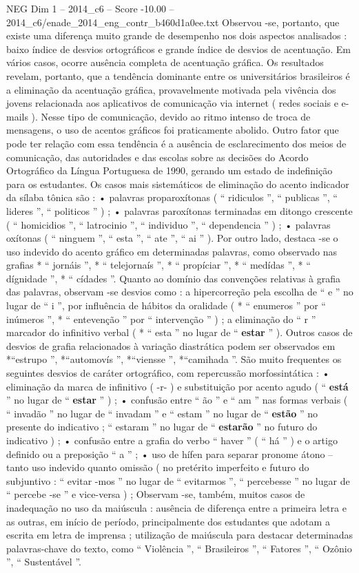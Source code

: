 \begin{textsample}{NEG Dim 1 – 2014\_c6 – Score -10.00 – 2014\_c6/enade\_2014\_eng\_contr\_b460d1a0ee.txt}
Observou -se, portanto, que existe uma diferença muito grande de desempenho nos dois aspectos analisados : baixo índice de desvios ortográficos e grande índice de desvios de acentuação.
Em vários casos, ocorre ausência completa de acentuação gráfica.
Os resultados revelam, portanto, que a tendência dominante entre os universitários brasileiros é a eliminação da acentuação gráfica, provavelmente motivada pela vivência dos jovens relacionada aos aplicativos de comunicação via internet ( redes sociais e e-mails ).
Nesse tipo de comunicação, devido ao ritmo intenso de troca de mensagens, o uso de acentos gráficos foi praticamente abolido.
Outro fator que pode ter relação com essa tendência é a ausência de esclarecimento dos meios de comunicação, das autoridades e das escolas sobre as decisões do Acordo Ortográfico da Língua Portuguesa de 1990, gerando um estado de indefinição para os estudantes.
Os casos mais sistemáticos de eliminação do acento indicador da sílaba tônica são : • palavras proparoxítonas ( “ ridiculos ”, “ publicas ”, “ lideres ”, “ politicos ” ) ; • palavras paroxítonas terminadas em ditongo crescente ( “ homicidios ”, “ latrocinio ”, “ individuo ”, “ dependencia ” ) ; • palavras oxítonas ( “ ninguem ”, “ esta ”, “ ate ”, “ ai ” ).
Por outro lado, destaca -se o uso indevido do acento gráfico em determinadas palavras, como observado nas grafias * “ jornáis ”, * “ telejornaís ”, * “ propíciar ”, * “ medídas ”, * “ dígnidade ”, * “ cídades ”.
Quanto ao domínio das convenções relativas à grafia das palavras, observam -se desvios como : a hipercorreção pela escolha de “ e ” no lugar de “ i ”, por influência de hábitos da oralidade ( * “ enumeros ” por “ inúmeros ”, * “ entevenção ” por “ intervenção ” ) ; a eliminação do “ r ” marcador do infinitivo verbal ( * “ esta ” no lugar de “ \textbf{estar} ” ).
Outros casos de desvios de grafia relacionados à variação diastrática podem ser observados em *“estrupo ”, *“automovís ”, *“viensse ”, *“camihada ”.
São muito frequentes os seguintes desvios de caráter ortográfico, com repercussão morfossintática : • eliminação da marca de infinitivo ( -r- ) e substituição por acento agudo ( “ \textbf{está} ” no lugar de “ \textbf{estar} ” ) ; • confusão entre “ ão ” e “ am ” nas formas verbais ( “ invadão ” no lugar de “ invadam ” e “ estam ” no lugar de “ \textbf{estão} ” no presente do indicativo ; “ estaram ” no lugar de “ \textbf{estarão} ” no futuro do indicativo ) ; • confusão entre a grafia do verbo “ haver ” ( “ há ” ) e o artigo definido ou a preposição “ a ” ; • uso de hífen para separar pronome átono – tanto uso indevido quanto omissão ( no pretérito imperfeito e futuro do subjuntivo : “ evitar -mos ” no lugar de “ evitarmos ”, “ percebesse ” no lugar de “ percebe -se ” e vice-versa ) ; Observam -se, também, muitos casos de inadequação no uso da maiúscula : ausência de diferença entre a primeira letra e as outras, em início de período, principalmente dos estudantes que adotam a escrita em letra de imprensa ; utilização de maiúscula para destacar determinadas palavras-chave do texto, como “ Violência ”, “ Brasileiros ”, “ Fatores ”, “ Ozônio ”, “ Sustentável ”.

\end{textsample}
